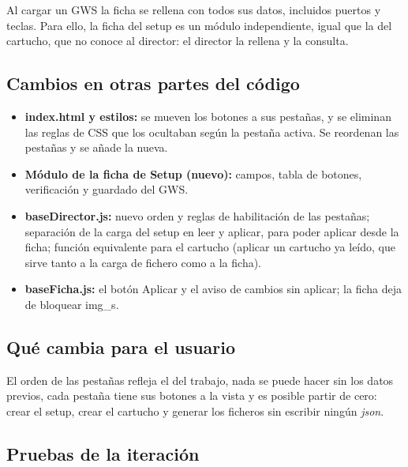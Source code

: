 Al cargar un GWS la ficha se rellena con todos sus datos, incluidos puertos y teclas. Para ello, la ficha del setup es un módulo independiente, igual que la del cartucho, que no conoce al director: el director la rellena y la consulta.

\subsection{Cambios en otras partes del código}
\label{sec:F5I12Codigo}

\begin{itemize}
	\item \textbf{index.html y estilos:} se mueven los botones a sus pestañas, y se eliminan las reglas de CSS que los ocultaban según la pestaña activa. Se reordenan las pestañas y se añade la nueva.
	\item \textbf{Módulo de la ficha de Setup (nuevo):} campos, tabla de botones, verificación y guardado del GWS.
	\item \textbf{baseDirector.js:} nuevo orden y reglas de habilitación de las pestañas; separación de la carga del setup en leer y aplicar, para poder aplicar desde la ficha; función equivalente para el cartucho (aplicar un cartucho ya leído, que sirve tanto a la carga de fichero como a la ficha).
	\item \textbf{baseFicha.js:} el botón Aplicar y el aviso de cambios sin aplicar; la ficha deja de bloquear img\_s.
\end{itemize}

\subsection{Qué cambia para el usuario}
\label{sec:F5I12Usuario}

El orden de las pestañas refleja el del trabajo, nada se puede hacer sin los datos previos, cada pestaña tiene sus botones a la vista y es posible partir de cero: crear el setup, crear el cartucho y generar los ficheros sin escribir ningún \emph{json}.

\subsection{Pruebas de la iteración}
\label{sec:F5I12Pruebas}


